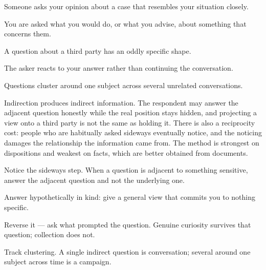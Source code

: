 \begin{feedback}
  \item Someone asks your opinion about a case that resembles your situation closely.
  \item You are asked what you would do, or what you advise, about something that concerns them.
  \item A question about a third party has an oddly specific shape.
  \item The asker reacts to your answer rather than continuing the conversation.
  \item Questions cluster around one subject across several unrelated conversations.
\end{feedback}

\begin{failure}
Indirection produces indirect information. The respondent may answer the adjacent question honestly while the real position stays hidden, and projecting a view onto a third party is not the same as holding it. There is also a reciprocity cost: people who are habitually asked sideways eventually notice, and the noticing damages the relationship the information came from. The method is strongest on dispositions and weakest on facts, which are better obtained from documents.
\end{failure}

\begin{countermeasures}
  \item Notice the sideways step. When a question is adjacent to something sensitive, answer the adjacent question and not the underlying one.
  \item Answer hypothetically in kind: give a general view that commits you to nothing specific.
  \item Reverse it --- ask what prompted the question. Genuine curiosity survives that question; collection does not.
  \item Track clustering. A single indirect question is conversation; several around one subject across time is a campaign.
\end{countermeasures}

\seesources
{}
